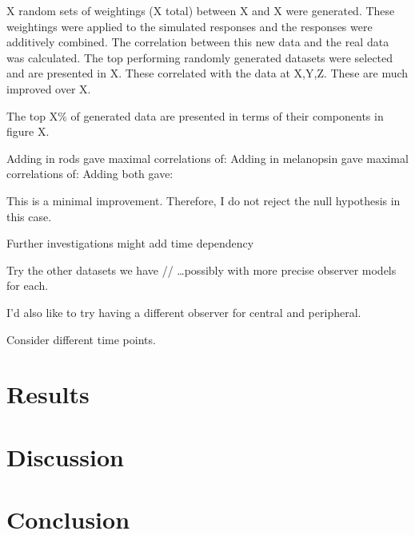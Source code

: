 X random sets of weightings (X total) between X and X were generated. These weightings were applied to the simulated responses and the responses were additively combined. The correlation between this new data and the real data was calculated. The top performing randomly generated datasets were selected and are presented in X. These correlated with the data at X,Y,Z. These are much improved over X.

The top X\% of generated data are presented in terms of their components in figure X.

Adding in rods gave maximal correlations of: 
Adding in melanopsin gave maximal correlations of:
Adding both gave:

This is a minimal improvement. Therefore, I do not reject the null hypothesis in this case.

Further investigations might add time dependency

Try the other datasets we have //
\dots possibly with more precise observer models for each.

I’d also like to try having a different observer for central and peripheral.

Consider different time points.	




\section{Results}
\section{Discussion}
\section{Conclusion}